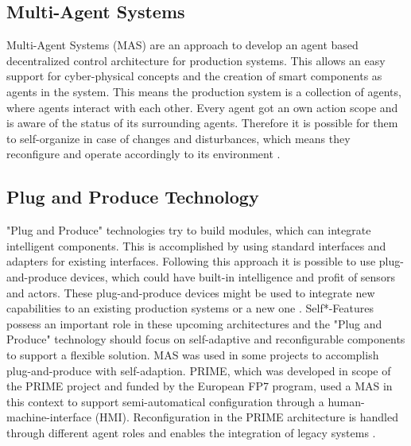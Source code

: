 \documentclass[conference,compsoc]{IEEEtran}
\begin{document}
\subsection{Multi-Agent Systems}
Multi-Agent Systems (MAS) are an approach to develop an agent based decentralized control architecture for production systems. This allows an easy support for cyber-physical concepts and the creation of smart components as agents in the system. This means the production system is a collection of agents, where agents interact with each other. Every agent got an own action scope and is aware of the status of its surrounding agents. Therefore it is possible for them to self-organize in case of changes and disturbances, which means they reconfigure and operate accordingly to its environment \cite{HarmonizedSystems}.

\subsection{Plug and Produce Technology}
"Plug and Produce" technologies try to build modules, which can integrate intelligent components. This is accomplished by using standard interfaces and adapters for existing interfaces. Following this approach it is possible to use plug-and-produce devices, which could have built-in intelligence and profit of sensors and actors. These plug-and-produce devices might be used to integrate new capabilities to an existing production systems or a new one \cite{HarmonizedSystems}. Self*-Features possess an important role in these upcoming architectures \cite{SpecPERFoRM} and the "Plug and Produce" technology should focus on self-adaptive and reconfigurable components to support a flexible solution. MAS was used in some projects to accomplish plug-and-produce with self-adaption. PRIME, which was developed in scope of the PRIME project and funded by the European FP7 program, used a MAS in this context to support semi-automatical configuration through a human-machine-interface (HMI). Reconfiguration in the PRIME architecture is handled through different agent roles and enables the integration of legacy systems \cite{HarmonizedSystems}.
\end{document}

